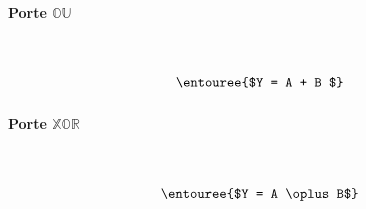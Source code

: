 \documentclass{report}
\begin{document}
\begin{multicols*}{3}
    \paragraph{Porte $\mathbb{OU}$}
    \mbox{}\vspace{1em}\\
    \begin{minipage}{\columnwidth}
        \begin{minipage}[b]{0.5\columnwidth}
            \centering
            \orgate
        \end{minipage}%
        \begin{minipage}[b]{0.5\columnwidth}
            \centering
        \end{minipage}
    \end{minipage}
    \[\entouree{$Y = A + B $} \]



    \paragraph{Porte $\mathbb{XOR}$}
    \mbox{}\vspace{1em}\\
    \begin{minipage}{\columnwidth}
        \begin{minipage}[b]{0.5\columnwidth}
            \centering
            \xorgate
        \end{minipage}%
        \begin{minipage}[b]{0.5\columnwidth}
            \centering
        \end{minipage}
    \end{minipage} 
    \[\entouree{$Y = A \oplus B$} \]




\end{multicols*}
\end{document}
